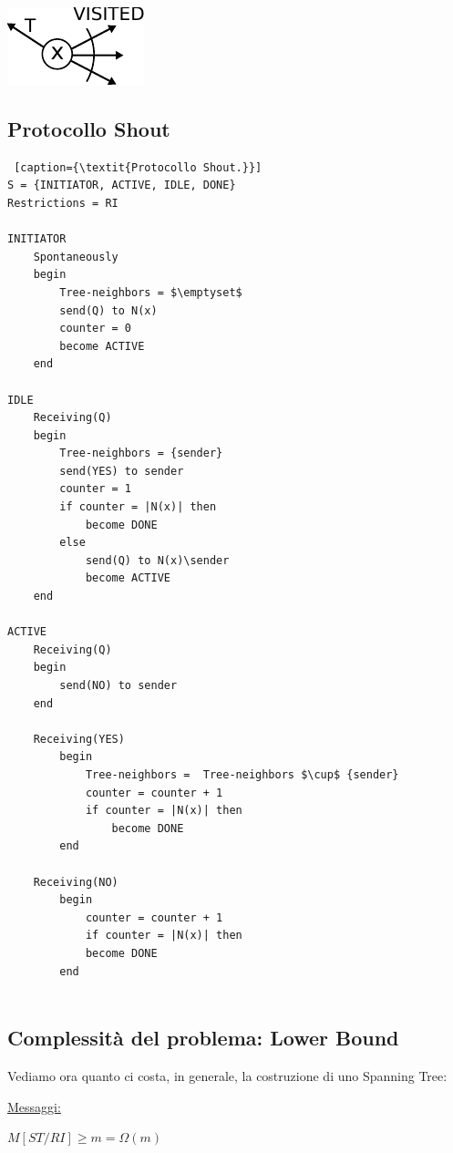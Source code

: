 \begin{center}
    \includegraphics[scale=1]{capitoli/costruzione-spanning-tree/imgs/n_22}
\end{center}

\subsection{Protocollo Shout}
\begin{lstlisting} [caption={\textit{Protocollo Shout.}}]
S = {INITIATOR, ACTIVE, IDLE, DONE}
Restrictions = RI

INITIATOR 
    Spontaneously
    begin
        Tree-neighbors = $\emptyset$
        send(Q) to N(x)
        counter = 0
        become ACTIVE
    end

IDLE
    Receiving(Q)
    begin
        Tree-neighbors = {sender}
        send(YES) to sender
        counter = 1
        if counter = |N(x)| then
            become DONE
        else
            send(Q) to N(x)\sender
            become ACTIVE
    end

ACTIVE
    Receiving(Q)
    begin
        send(NO) to sender
    end
    
    Receiving(YES)
        begin
            Tree-neighbors =  Tree-neighbors $\cup$ {sender}
            counter = counter + 1
            if counter = |N(x)| then 
                become DONE        
        end
    
    Receiving(NO)
        begin
            counter = counter + 1
            if counter = |N(x)| then
            become DONE
        end
    
\end{lstlisting}

\subsection{Complessità del problema: Lower Bound}
Vediamo ora quanto ci costa, in generale, la costruzione di uno Spanning Tree:

\underline{Messaggi:}
\begin{center}
    $M[ST/RI] \geq m = \Omega(m)$
\end{center}

